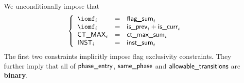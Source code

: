 We unconditionally impose that
\[
	\left\{ \begin{array}{lcl}
		\iomf        _{i} & = & \locFlagSum  _{i}                         \\
		\iomf        _{i} & = & \locIsPrevConf _{i} + \locIsCurrConf _{i} \\
		\maxCt       _{i} & = & \locMaxCtSum _{i}                         \\
		\instruction _{i} & = & \locInstSum  _{i}                         \\
	\end{array} \right.
\]
\saNote{}
The first two constraints implicitly impose flag exclusivity constraints.
They further imply that all of
$\textsf{phase\_entry}$,
$\textsf{same\_phase}$ and
$\textsf{allowable\_transitions}$
are \textbf{binary}.
